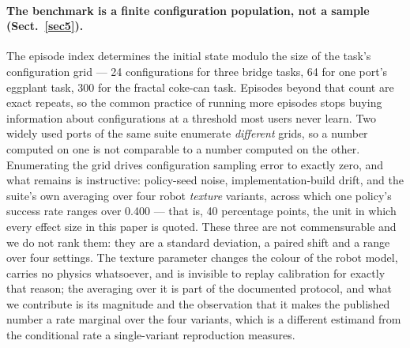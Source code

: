 \documentclass[pdflatex,iicol,sn-apa]{sn-jnl}
\theoremstyle{remark}
\begin{document}
\paragraph{The benchmark is a finite configuration population, not a sample (Sect.~\ref{sec5}).}
The episode index determines the initial state modulo the size of the task's configuration grid ---
24 configurations for three bridge tasks, 64 for one port's eggplant task, 300 for the fractal
coke-can task. Episodes beyond that count are exact repeats, so the common practice of running more
episodes stops buying information about configurations at a threshold most users never learn. Two
widely used ports of the same suite enumerate \emph{different} grids, so a number computed on one is
not comparable to a number computed on the other. Enumerating the grid drives configuration sampling
error to exactly zero, and what remains is instructive: policy-seed noise, implementation-build
drift, and the suite's own averaging over four robot \emph{texture} variants, across which one
policy's success rate ranges over 0.400 --- that is, 40 percentage points, the unit in which every
effect size in this paper is quoted. These three are not commensurable and we do not rank them: they
are a standard deviation, a paired shift and a range over four settings. The texture parameter
changes the colour of the robot model, carries no physics whatsoever, and is invisible to replay
calibration for exactly that reason; the averaging over it is part of the documented protocol, and
what we contribute is its magnitude and the observation that it makes the published number a rate
marginal over the four variants, which is a different estimand from the conditional rate a
single-variant reproduction measures.
\end{document}
